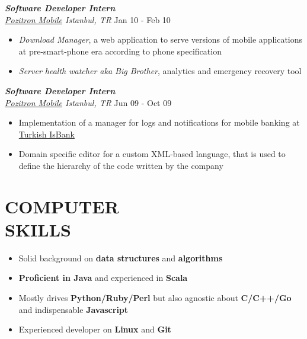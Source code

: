 \documentclass[line, margin]{res}
\begin{document}
\begin{resume}
	{\sl \textbf{Software Developer Intern} \\ \href{http://www.pozitron.com/}{Pozitron Mobile} Istanbul, TR} \hfill Jan 10 - Feb 10 \\
	\vspace{-0.3cm}
	\begin{itemize} \itemsep -2pt
		\item \textit{Download Manager}, a web application to serve versions of mobile applications at pre-smart-phone era according to phone specification
		\item \textit{Server health watcher aka Big Brother}, analytics and emergency recovery tool
	\end{itemize}							

	{\sl \textbf{Software Developer Intern} \\ \href{http://www.pozitron.com/}{Pozitron Mobile} Istanbul, TR} \hfill Jun 09 - Oct 09\\
	\vspace{-0.3cm}
	\begin{itemize} \itemsep -2pt
		\item Implementation of a manager for logs and notifications for mobile banking at \href{http://www.isbank.com.tr/English/}{Turkish IsBank}
		\item Domain specific editor for a custom XML-based language, that is used to define the hierarchy of the code written by the company
	\end{itemize}

\section{COMPUTER \\ SKILLS} 
	\begin{itemize}
		\item Solid background on \textbf{data structures} and \textbf{algorithms}
		\item \textbf{Proficient in Java} and experienced in \textbf{Scala}
		\item Mostly drives \textbf{Python/Ruby/Perl} but also agnostic about \textbf{C/C++/Go} and indispensable \textbf{Javascript}
		\item Experienced developer on \textbf{Linux} and \textbf{Git}
	\end{itemize}
\end{resume}
\end{document}
